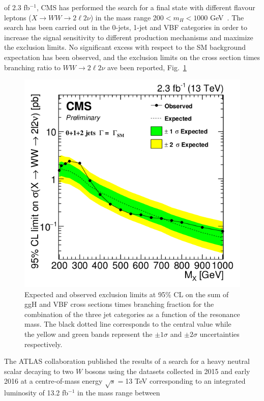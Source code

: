 of 2.3 fb$^{-1}$, CMS has  performed the search for a final state with different flavour leptons ($X \to WW \to 2\ell 2\nu$) in the mass range  200$< m_H< 1000$ GeV~\cite{CMS-PAS-HIG-16-023}. The search has been carried out in the 0-jets, 1-jet and VBF categories in order to increase the signal sensitivity to different production mechanisms and maximize the exclusion limits. 
No significant excess with respect to the SM background expectation has been observed, and
the exclusion limits on the cross section times branching ratio to  $ WW \to 2\ell 2\nu$ ave been reported, Fig.~\ref{lim_2015}
\begin{figure}
\centering
\includegraphics[scale= 0.4]{../Cap1/lim_2015}
\caption{Expected and observed exclusion limits at 95\% CL on the sum of ggH and VBF cross
sections times branching fraction for the combination of the three jet categories as a function
of the resonance mass. The black dotted line corresponds to the central value while the yellow
and green bands represent the $\pm 1\sigma$ and $\pm 2\sigma$  uncertainties respectively. }
\label{lim_2015}
\end{figure}
The ATLAS collaboration published the results of a search for a heavy neutral scalar decaying to two $W$ bosons using the datasets collected in 2015 and early
2016 at a centre-of-mass energy $\sqrt{s}=$13 TeV corresponding to an integrated luminosity of 13.2 fb$^{-1}$ in the mass range between
